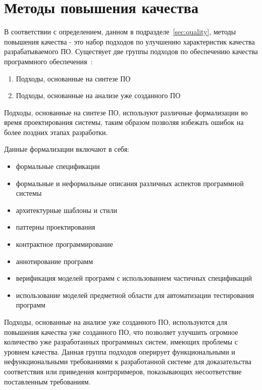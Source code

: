\section{Методы повышения качества}
\label{sec:quality_methods}

В соответствии с определением, данном в подразделе~\ref{sec:quality}, методы
повышения качества - это набор подходов по улучшению характеристик качества
разрабатываемого ПО. Существует две группы подходов по обеспечению качества
программного обеспечения~\cite{itsykson}:

\begin{enumerate}
    \item Подходы, основанные на синтезе ПО
    \item Подходы, основанные на анализе уже созданного ПО
\end{enumerate}

Подходы, основанные на синтезе ПО, используют различные формализации во время
проектирования системы, таким образом позволяя избежать ошибок на более поздних
этапах разработки.

Данные формализации включают в себя:

\begin{itemize}
    \item формальные спецификации
    \item формальные и неформальные описания различных аспектов программной
    системы
    \item архитектурные шаблоны и стили
    \item паттерны проектирования
    \item контрактное программирование
    \item аннотирование программ
    \item верификация моделей программ с использованием частичных спецификаций
    \item использование моделей предметной области для автоматизации
    тестирования программ
\end{itemize}

Подходы, основанные на анализе уже созданного ПО, используются для повышения
качества уже созданного ПО, что позволяет улучшить огромное количество уже
разработанных программных систем, имеющих проблемы с уровнем качества. Данная
группа подходов оперирует функциональными и нефункциональными требованиями к
разработанной системе для доказательства соответствия или приведения
контрпримеров, показывающих несоответствие поставленным требованиям.

